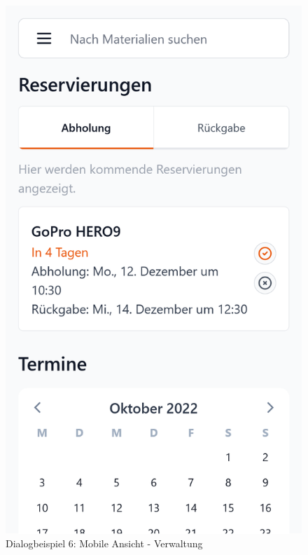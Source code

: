 \begin{figure}[p]
    \centering
    \includegraphics[scale=0.19]{Bilder/Dialgobeispiel/Reservierung Abholung.png}
    \caption{Dialogbeispiel 6: Mobile Ansicht - Verwaltung}
    \label{fig:georg2}
\end{figure}

